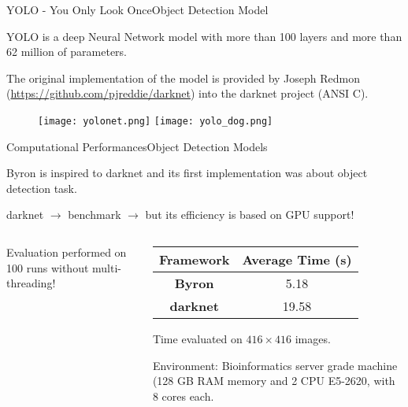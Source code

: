 \documentclass{standalone}
\begin{document}
\begin{frame}{YOLO - You Only Look Once}{Object Detection Model}

  \scriptsize{YOLO is a deep Neural Network model with more than 100 layers and more than 62 million of parameters.}

  \scriptsize{The original implementation of the model is provided by Joseph Redmon (\url{https://github.com/pjreddie/darknet}) into the \textsf{darknet} project (\textsf{ANSI C}).}

  \begin{figure}
    \begin{overprint}
      \centering\texttt{[image: yolonet.png]}
      \centering\texttt{[image: yolo\_dog.png]}
    \end{overprint}
  \end{figure}

\end{frame}


\begin{frame}{Computational Performances}{Object Detection Models}

  \scriptsize{\textsf{Byron} is inspired to \textsf{darknet} and its first implementation was about object detection task.}

  \scriptsize{\textsf{darknet} $\rightarrow$ benchmark $\rightarrow$ but its efficiency is based on GPU support!}

  \vfill
  \begin{columns}
    \begin{column}{0.6\textwidth}
      \scriptsize{Evaluation performed on 100 runs without multi-threading!}

      \def\svgwidth{\linewidth}
    \end{column}
    \begin{column}{0.4\textwidth}
      \scriptsize{
      \begin{tabular}{cc}
        \hline \rowcolor{NormalBlue}
        \textbf{Framework} & \textbf{Average Time (s)} \\
        \hline
        \textbf{Byron}     & 5.18                      \\
        \textbf{darknet}   & 19.58                     \\
        \hline
      \end{tabular}
      }

      \vspace{0.5cm}
      \scriptsize{Time evaluated on $416\times 416$ images.}

      \scriptsize{Environment: Bioinformatics server grade machine (128 GB RAM memory and 2 CPU E5-2620, with 8 cores each.}
    \end{column}
  \end{columns}

\end{frame}
\end{document}
